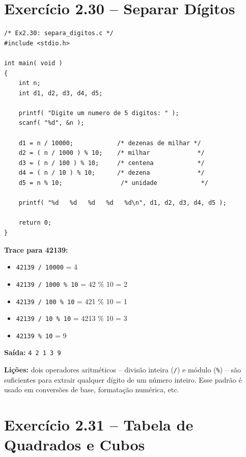 \documentclass[12pt,a4paper]{article}
\begin{document}
\section{Exercício 2.30 -- Separar Dígitos}

\begin{respostabox}
\begin{lstlisting}
/* Ex2.30: separa_digitos.c */
#include <stdio.h>

int main( void )
{
    int n;
    int d1, d2, d3, d4, d5;

    printf( "Digite um numero de 5 digitos: " );
    scanf( "%d", &n );

    d1 = n / 10000;            /* dezenas de milhar */
    d2 = ( n / 1000 ) % 10;    /* milhar             */
    d3 = ( n / 100 ) % 10;     /* centena            */
    d4 = ( n / 10 ) % 10;      /* dezena             */
    d5 = n % 10;                /* unidade            */

    printf( "%d   %d   %d   %d   %d\n", d1, d2, d3, d4, d5 );

    return 0;
}
\end{lstlisting}

\textbf{Trace para 42139:}
\begin{itemize}[noitemsep]
  \item \texttt{42139 / 10000} = 4
  \item \texttt{42139 / 1000 \% 10} = 42 \% 10 = 2
  \item \texttt{42139 / 100 \% 10} = 421 \% 10 = 1
  \item \texttt{42139 / 10 \% 10} = 4213 \% 10 = 3
  \item \texttt{42139 \% 10} = 9
\end{itemize}

\textbf{Saída:} \texttt{4   2   1   3   9}

\textbf{Lições:} dois operadores aritméticos -- divisão inteira (\texttt{/}) e
módulo (\texttt{\%}) -- são suficientes para extrair qualquer dígito de um número
inteiro. Esse padrão é usado em conversões de base, formatação numérica, etc.
\end{respostabox}

\newpage

\section{Exercício 2.31 -- Tabela de Quadrados e Cubos}
\end{document}
